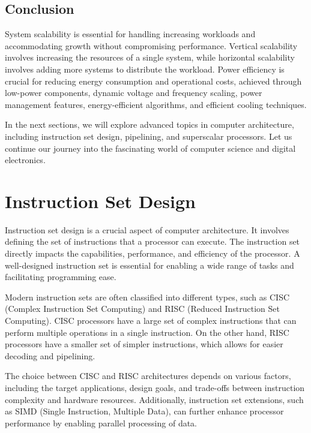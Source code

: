 \documentclass{article}
\begin{document}
\subsection{Conclusion}

System scalability is essential for handling increasing workloads and accommodating growth without compromising performance. Vertical scalability involves increasing the resources of a single system, while horizontal scalability involves adding more systems to distribute the workload. Power efficiency is crucial for reducing energy consumption and operational costs, achieved through low-power components, dynamic voltage and frequency scaling, power management features, energy-efficient algorithms, and efficient cooling techniques.

In the next sections, we will explore advanced topics in computer architecture, including instruction set design, pipelining, and superscalar processors. Let us continue our journey into the fascinating world of computer science and digital electronics.

\newpage

\section{Instruction Set Design}

Instruction set design is a crucial aspect of computer architecture. It involves defining the set of instructions that a processor can execute. The instruction set directly impacts the capabilities, performance, and efficiency of the processor. A well-designed instruction set is essential for enabling a wide range of tasks and facilitating programming ease.

Modern instruction sets are often classified into different types, such as CISC (Complex Instruction Set Computing) and RISC (Reduced Instruction Set Computing). CISC processors have a large set of complex instructions that can perform multiple operations in a single instruction. On the other hand, RISC processors have a smaller set of simpler instructions, which allows for easier decoding and pipelining.

The choice between CISC and RISC architectures depends on various factors, including the target applications, design goals, and trade-offs between instruction complexity and hardware resources. Additionally, instruction set extensions, such as SIMD (Single Instruction, Multiple Data), can further enhance processor performance by enabling parallel processing of data.
\end{document}

